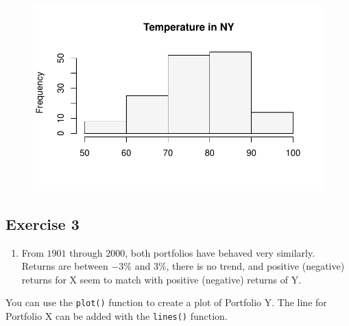\documentclass[
  letterpaper,
  DIV=11,
  numbers=noendperiod]{scrreprt}
\providecommand{\tightlist}{%
  \setlength{\itemsep}{0pt}\setlength{\parskip}{0pt}}\usepackage{longtable,booktabs,array}
\begin{document}
\begin{figure}[H]

{\centering \includegraphics{./03-DescriptiveII_files/figure-pdf/unnamed-chunk-13-1.pdf}

}

\end{figure}

\hypertarget{exercise-3-3}{%
\subsection*{Exercise 3}\label{exercise-3-3}}

\begin{blackbox}

\begin{enumerate}
\def\labelenumi{\arabic{enumi}.}
\tightlist
\item
  From \(1901\) through \(2000\), both portfolios have behaved very
  similarly. Returns are between \(-3\)\% and \(3\)\%, there is no
  trend, and positive (negative) returns for X seem to match with
  positive (negative) returns of Y.
\end{enumerate}

\end{blackbox}

You can use the \texttt{plot()} function to create a plot of Portfolio
Y. The line for Portfolio X can be added with the \texttt{lines()}
function.
\end{document}
